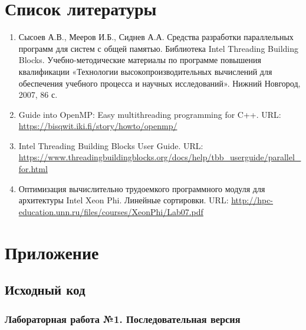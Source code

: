 \documentclass{report}
\begin{document}
\section*{Список литературы}
\begin{enumerate}
\item Сысоев А.В., Мееров И.Б., Сиднев А.А. Средства разработки параллельных программ для систем с общей памятью. Библиотека Intel Threading Building Blocks. Учебно-методические материалы по программе повышения квалификации «Технологии высокопроизводительных вычислений для обеспечения учебного процесса и научных исследований». Нижний Новгород, 2007, 86 с.
\item Guide into OpenMP: Easy multithreading programming for C++. URL: \url{https://bisqwit.iki.fi/story/howto/openmp/}
\item Intel Threading Building Blocks User Guide. URL: \url{https://www.threadingbuildingblocks.org/docs/help/tbb_userguide/parallel_for.html}
\item Оптимизация вычислительно трудоемкого программного модуля для архитектуры Intel Xeon Phi. Линейные сортировки. URL: \url{http://hpc-education.unn.ru/files/courses/XeonPhi/Lab07.pdf}
\end{enumerate}

\newpage
\section*{Приложение}

\subsection*{Исходный код}

\subsubsection*{Лабораторная работа №1. Последовательная версия}



\end{document}

